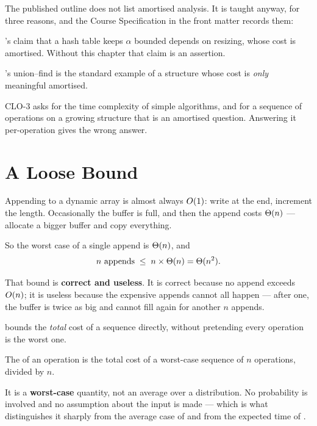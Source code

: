 \begin{alertbox}
The published outline does not list amortised analysis. It is taught anyway,
for three reasons, and the Course Specification in the front matter records
them:

\begin{tightnum}
  \item {}'s claim that a hash table keeps $\alpha$ bounded
        depends on resizing, whose cost is amortised. Without this chapter that
        claim is an assertion.
  \item {}'s union--find is the standard example of a structure whose
        cost is \emph{only} meaningful amortised.
  \item CLO-3 asks for the time complexity of simple algorithms, and for a
        sequence of operations on a growing structure that is an amortised
        question. Answering it per-operation gives the wrong answer.
\end{tightnum}
\end{alertbox}

\section{A Loose Bound}

\begin{conceptbox}
Appending to a dynamic array is almost always $O(1)$: write at the end,
increment the length. Occasionally the buffer is full, and then the append
costs $\Theta(n)$ --- allocate a bigger buffer and copy everything.

\smallskip
So the worst case of a single append is $\Theta(n)$, and
\[ n \text{ appends} \;\le\; n \times \Theta(n) = \Theta(n^{2}). \]

\smallskip
That bound is \textbf{correct and useless}. It is correct because no append
exceeds $O(n)$; it is useless because the expensive appends cannot all
happen --- after one, the buffer is twice as big and cannot fill again for
another $n$ appends.

\smallskip
{} bounds the \emph{total} cost of a sequence directly,
without pretending every operation is the worst one.
\end{conceptbox}

\begin{definitionbox}
The  of an operation is the total cost of a worst-case
sequence of $n$ operations, divided by $n$.

\smallskip
It is a \textbf{worst-case} quantity, not an average over a distribution. No
probability is involved and no assumption about the input is made --- which is
what distinguishes it sharply from the average case of  and from
the expected time of .
\end{definitionbox}

